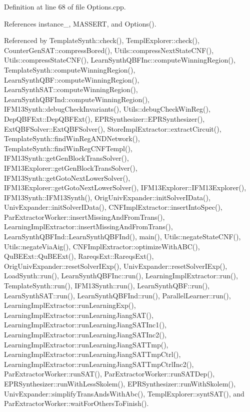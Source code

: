 Definition at line 68 of file Options.\-cpp.



References instance\-\_\-, M\-A\-S\-S\-E\-R\-T, and Options().



Referenced by Template\-Synth\-::check(), Templ\-Explorer\-::check(), Counter\-Gen\-S\-A\-T\-::compress\-Bored(), Utils\-::compress\-Next\-State\-C\-N\-F(), Utils\-::compress\-State\-C\-N\-F(), Learn\-Synth\-Q\-B\-F\-Inc\-::compute\-Winning\-Region(), Template\-Synth\-::compute\-Winning\-Region(), Learn\-Synth\-Q\-B\-F\-::compute\-Winning\-Region(), Learn\-Synth\-S\-A\-T\-::compute\-Winning\-Region(), Learn\-Synth\-Q\-B\-F\-Ind\-::compute\-Winning\-Region(), I\-F\-M13\-Synth\-::debug\-Check\-Invariants(), Utils\-::debug\-Check\-Win\-Reg(), Dep\-Q\-B\-F\-Ext\-::\-Dep\-Q\-B\-F\-Ext(), E\-P\-R\-Synthesizer\-::\-E\-P\-R\-Synthesizer(), Ext\-Q\-B\-F\-Solver\-::\-Ext\-Q\-B\-F\-Solver(), Store\-Impl\-Extractor\-::extract\-Circuit(), Template\-Synth\-::find\-Win\-Reg\-A\-N\-D\-Network(), Template\-Synth\-::find\-Win\-Reg\-C\-N\-F\-Templ(), I\-F\-M13\-Synth\-::get\-Gen\-Block\-Trans\-Solver(), I\-F\-M13\-Explorer\-::get\-Gen\-Block\-Trans\-Solver(), I\-F\-M13\-Synth\-::get\-Goto\-Next\-Lower\-Solver(), I\-F\-M13\-Explorer\-::get\-Goto\-Next\-Lower\-Solver(), I\-F\-M13\-Explorer\-::\-I\-F\-M13\-Explorer(), I\-F\-M13\-Synth\-::\-I\-F\-M13\-Synth(), Orig\-Univ\-Expander\-::init\-Solver\-I\-Data(), Univ\-Expander\-::init\-Solver\-I\-Data(), C\-N\-F\-Impl\-Extractor\-::insert\-Into\-Spec(), Par\-Extractor\-Worker\-::insert\-Missing\-And\-From\-Trans(), Learning\-Impl\-Extractor\-::insert\-Missing\-And\-From\-Trans(), Learn\-Synth\-Q\-B\-F\-Ind\-::\-Learn\-Synth\-Q\-B\-F\-Ind(), main(), Utils\-::negate\-State\-C\-N\-F(), Utils\-::negate\-Via\-Aig(), C\-N\-F\-Impl\-Extractor\-::optimize\-With\-A\-B\-C(), Qu\-B\-E\-Ext\-::\-Qu\-B\-E\-Ext(), Rareqs\-Ext\-::\-Rareqs\-Ext(), Orig\-Univ\-Expander\-::reset\-Solver\-I\-Exp(), Univ\-Expander\-::reset\-Solver\-I\-Exp(), Load\-Synth\-::run(), Learn\-Synth\-Q\-B\-F\-Inc\-::run(), Learning\-Impl\-Extractor\-::run(), Template\-Synth\-::run(), I\-F\-M13\-Synth\-::run(), Learn\-Synth\-Q\-B\-F\-::run(), Learn\-Synth\-S\-A\-T\-::run(), Learn\-Synth\-Q\-B\-F\-Ind\-::run(), Parallel\-Learner\-::run(), Learning\-Impl\-Extractor\-::run\-Learning\-Exp(), Learning\-Impl\-Extractor\-::run\-Learning\-Jiang\-S\-A\-T(), Learning\-Impl\-Extractor\-::run\-Learning\-Jiang\-S\-A\-T\-Inc1(), Learning\-Impl\-Extractor\-::run\-Learning\-Jiang\-S\-A\-T\-Inc2(), Learning\-Impl\-Extractor\-::run\-Learning\-Jiang\-S\-A\-T\-Tmp(), Learning\-Impl\-Extractor\-::run\-Learning\-Jiang\-S\-A\-T\-Tmp\-Ctrl(), Learning\-Impl\-Extractor\-::run\-Learning\-Jiang\-S\-A\-T\-Tmp\-Ctrl\-Inc2(), Par\-Extractor\-Worker\-::run\-S\-A\-T(), Par\-Extractor\-Worker\-::run\-S\-A\-T\-Dep(), E\-P\-R\-Synthesizer\-::run\-With\-Less\-Skolem(), E\-P\-R\-Synthesizer\-::run\-With\-Skolem(), Univ\-Expander\-::simplify\-Trans\-Ands\-With\-Abc(), Templ\-Explorer\-::synt\-S\-A\-T(), and Par\-Extractor\-Worker\-::wait\-For\-Others\-To\-Finish().

